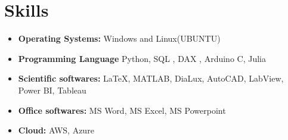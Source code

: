 \documentclass[11pt,a4paper]{moderncv}
\begin{document}
	
	
	
	
	



%
%	
%
%

\section{Skills}
%
%	
%	
%	
%	
%	
	
\begin{itemize}
	
	\item \textbf{Operating Systems:} Windows and Linux(UBUNTU)
	
	\item \textbf{Programming Language} Python, SQL , DAX , Arduino C, Julia
	
	\item \textbf{Scientific softwares:} \LaTeX, MATLAB, DiaLux, AutoCAD, LabView, Power BI, Tableau%
	\item \textbf{Office softwares:} MS Word, MS Excel, MS Powerpoint 
	
	\item \textbf{Cloud:} AWS, Azure
	
\end{itemize}
	
\end{document}
